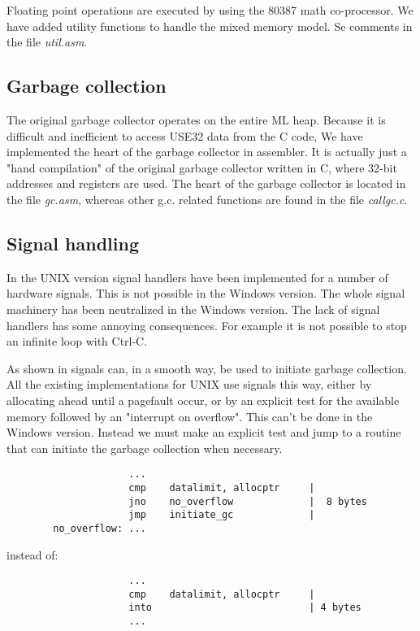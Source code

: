 Floating point operations are executed by using the 80387 math
co-processor. We have added utility functions to handle the mixed
memory model. Se comments in the file {\em util.asm\/}.


\subsection{Garbage collection}

The original garbage collector operates on the entire ML heap. Because
it is difficult and inefficient to access USE32 data from the C code,
We have implemented the heart of the garbage collector in assembler. It
is actually just a "hand compilation" of the original garbage
collector written in C, where 32-bit addresses and registers are used.
The heart of the garbage collector is located in the file {\em
gc.asm\/}, whereas other g.c. related functions are found in the file
{\em callgc.c\/}.

\subsection{Signal handling}

In the UNIX version signal handlers have been implemented for a number
of hardware signals. This is not possible in the Windows version. The
whole signal machinery has been neutralized in the Windows version.
The lack of signal handlers has some annoying consequences. For
example it is not possible to stop an infinite loop with Ctrl-C.

As shown in \cite{bib:gc} signals can, in a smooth way, be used to
initiate garbage collection. All the existing implementations for UNIX
use signals this way, either by allocating ahead until a pagefault
occur, or by an explicit test for the available memory followed by an
"interrupt on overflow". This can't be done in the Windows version.
Instead we must make an explicit test and jump to a routine that can
initiate the garbage collection when necessary.
\begin{verbatim}
                     ...
                     cmp    datalimit, allocptr     |
                     jno    no_overflow             |  8 bytes
                     jmp    initiate_gc             |
        no_overflow: ...
\end{verbatim}

instead of:
\begin{verbatim}
                     ...
                     cmp    datalimit, allocptr     |
                     into                           | 4 bytes
                     ...
\end{verbatim}

